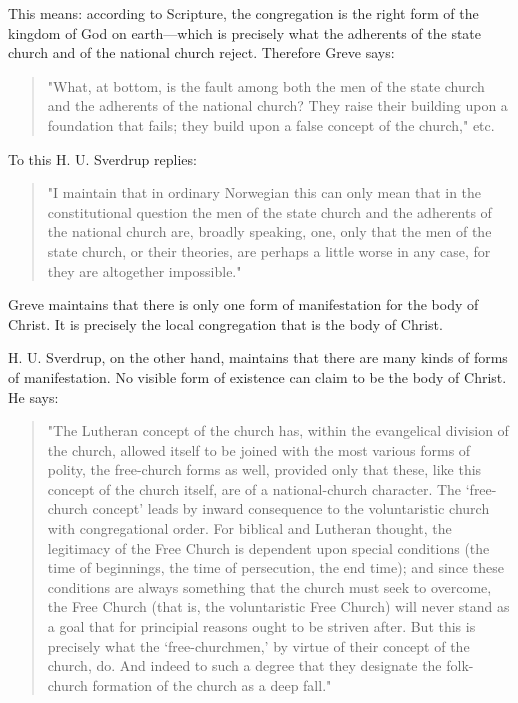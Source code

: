 This means: according to Scripture, the congregation is the right form of the kingdom of God on earth—which is precisely what the adherents of the state church and of the national church reject. Therefore Greve says:

\begin{quote}
"What, at bottom, is the fault among both the men of the state church and the adherents of the national church? They raise their building upon a foundation that fails; they build upon a false concept of the church," etc.
\end{quote}

To this H. U. Sverdrup replies:

\begin{quote}
"I maintain that in ordinary Norwegian this can only mean that in the constitutional question the men of the state church and the adherents of the national church are, broadly speaking, one, only that the men of the state church, or their theories, are perhaps a little worse in any case, for they are altogether impossible."
\end{quote}

Greve maintains that there is only one form of manifestation for the body of Christ. It is precisely the local congregation that is the body of Christ.

H. U. Sverdrup, on the other hand, maintains that there are many kinds of forms of manifestation. No visible form of existence can claim to be the body of Christ. He says:

\begin{quote}
"The Lutheran concept of the church has, within the evangelical division of the church, allowed itself to be joined with the most various forms of polity, the free-church forms as well, provided only that these, like this concept of the church itself, are of a national-church character. The ‘free-church concept’ leads by inward consequence to the voluntaristic church with congregational order. For biblical and Lutheran thought, the legitimacy of the Free Church is dependent upon special conditions (the time of beginnings, the time of persecution, the end time); and since these conditions are always something that the church must seek to overcome, the Free Church (that is, the voluntaristic Free Church) will never stand as a goal that for principial reasons ought to be striven after. But this is precisely what the ‘free-churchmen,’ by virtue of their concept of the church, do. And indeed to such a degree that they designate the folk-church formation of the church as a deep fall."
\end{quote}

